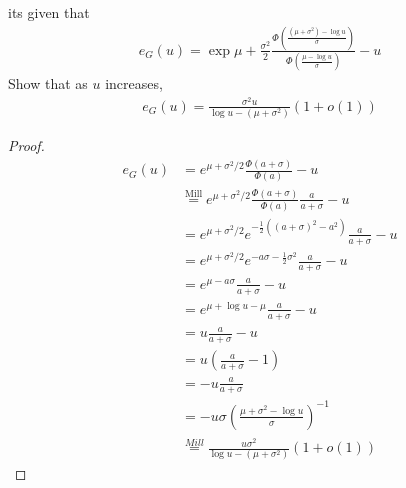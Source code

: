 \documentclass{article}
\begin{document}
its given that 
\begin{align*}
    e_G(u) = \exp{\mu + \frac{\sigma^2}{2}} \frac{\Phi\left( \frac{(\mu + \sigma^2) - \log u}{\sigma} \right)}{\Phi\left( \frac{\mu - \log u}{\sigma}\right)} - u 
\end{align*}
Show that as $u$ increases, 
\begin{align*}
    e_G(u) = \frac{\sigma^2 u }{\log u - (\mu + \sigma^2)} (1+ o(1))
\end{align*}
\begin{proof}

\begin{align*}
    e_G(u) &= e^{\mu + \sigma^2/2} \frac{\Phi(a + \sigma)}{\Phi(a)}-u \\
    &\overset{\text{Mill}}{=} e^{\mu + \sigma^2/2}\frac{\Phi(a + \sigma)}{\Phi(a)} \frac{a}{a+\sigma} -u\\
    &=e^{\mu + \sigma^2/2} e^{-\frac{1}{2}((a + \sigma)^2 - a^2)} \frac{a}{a + \sigma} - u\\
    &= e^{\mu + \sigma^2/2} e^{- a\sigma - \frac{1}{2}\sigma^2} \frac{a}{a + \sigma} - u\\
    &= e^{\mu - a\sigma}\frac{a}{a+\sigma} - u\\
    &= e^{\mu + \log u - \mu}\frac{a}{a+\sigma}- u \\
    &= u \frac{a}{a+\sigma} - u \\
    &= u\left( \frac{a}{a + \sigma}-1\right) \\
    &= -u\frac{a}{a + \sigma} \\
    &=-u  \sigma \left( \frac{\mu + \sigma^2 - \log u}{\sigma} \right)^{-1} \\
    &\overset{Mill}{=} \frac{u\sigma^2}{\log u - (\mu +\sigma^2)}(1 + o(1))
\end{align*}


\end{proof}
\end{document}
